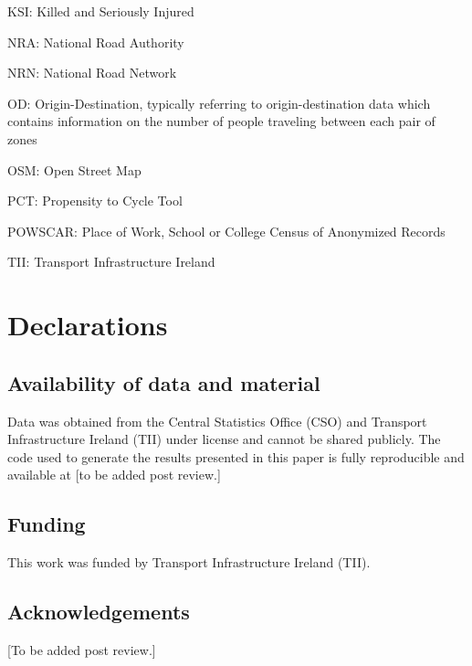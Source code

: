 \documentclass[
  super,
  preprint,
  3p]{elsarticle}
\begin{document}
KSI: Killed and Seriously Injured

NRA: National Road Authority

NRN: National Road Network

OD: Origin-Destination, typically referring to origin-destination data
which contains information on the number of people traveling between
each pair of zones

OSM: Open Street Map

PCT: Propensity to Cycle Tool

POWSCAR: Place of Work, School or College Census of Anonymized Records

TII: Transport Infrastructure Ireland

\section{Declarations}\label{declarations}

\subsection*{Availability of data and
material}\label{availability-of-data-and-material}

Data was obtained from the Central Statistics Office (CSO) and Transport
Infrastructure Ireland (TII) under license and cannot be shared
publicly. The code used to generate the results presented in this paper
is fully reproducible and available at {[}to be added post review.{]}

\subsection*{Funding}\label{funding}

This work was funded by Transport Infrastructure Ireland (TII).

\subsection*{Acknowledgements}\label{acknowledgements}

{[}To be added post review.{]}


  
\end{document}
